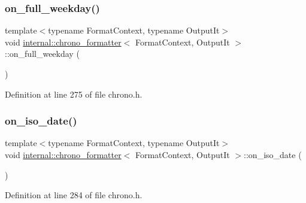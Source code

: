 \subsubsection{\texorpdfstring{on\+\_\+full\+\_\+weekday()}{on\_full\_weekday()}}
{\footnotesize\ttfamily template$<$typename Format\+Context, typename Output\+It$>$ \\
void \hyperlink{structinternal_1_1chrono__formatter}{internal\+::chrono\+\_\+formatter}$<$ Format\+Context, Output\+It $>$\+::on\+\_\+full\+\_\+weekday (\begin{DoxyParamCaption}{ }\end{DoxyParamCaption})\hspace{0.3cm}{\ttfamily [inline]}}



Definition at line 275 of file chrono.\+h.

\mbox{\label{structinternal_1_1chrono__formatter_ab7067476c026fa0fffedbd6aa7088713}} 
\subsubsection{\texorpdfstring{on\+\_\+iso\+\_\+date()}{on\_iso\_date()}}
{\footnotesize\ttfamily template$<$typename Format\+Context, typename Output\+It$>$ \\
void \hyperlink{structinternal_1_1chrono__formatter}{internal\+::chrono\+\_\+formatter}$<$ Format\+Context, Output\+It $>$\+::on\+\_\+iso\+\_\+date (\begin{DoxyParamCaption}{ }\end{DoxyParamCaption})\hspace{0.3cm}{\ttfamily [inline]}}



Definition at line 284 of file chrono.\+h.

\mbox{\label{structinternal_1_1chrono__formatter_a578e890af81d7ea6c4c3dcb64ba2e8e2}} 
